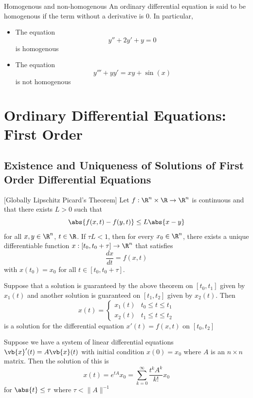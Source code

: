 \documentclass[a4paper]{article}
\begin{document}
\begin{defn}{Homogenous and non-homogenous}{} An ordinary differential equation is said to be homogenous if the term without a derivative is $0$. In particular,
\begin{itemize}
\item The equation $$y''+2y'+y=0$$ is homogenous
\item The equation $$y'''+yy'=xy+\sin(x)$$ is not homogenous
\end{itemize}
\end{defn}

\pagebreak
\section{Ordinary Differential Equations: First Order}
\subsection{Existence and Uniqueness of Solutions of First Order Differential Equations}
\begin{thm}{}{}[Globally Lipschitz Picard's Theorem] Let $f:\R^n\times\R\to\R^n$ is continuous and that there exists $L>0$ such that $$\abs{f(x,t)-f(y,t)}\leq L\abs{x-y}$$ for all $x,y\in\R^n$, $t\in\R$.  If $\tau L<1$, then for every $x_0\in\R^n$, there exists a unique differentiable function $x:[t_0,t_0+\tau]\to\R^n$ that satisfies $$\frac{dx}{dt}=f(x,t)$$ with $x(t_0)=x_0$ for all $t\in[t_0,t_0+\tau]$. 
\end{thm}

\begin{prp}{}{} Suppose that a solution is guaranteed by the above theorem on $[t_0,t_1]$ given by $x_1(t)$ and another solution is guaranteed on $[t_1,t_2]$ given by $x_2(t)$. Then $$x(t)=\begin{cases}
x_1(t) & t_0\leq t\leq t_1\\
x_2(t) & t_1\leq t\leq t_2
\end{cases}$$ is a solution for the differential equation $x'(t)=f(x,t)$ on $[t_0,t_2]$
\end{prp}

\begin{thm}{}{} Suppose we have a system of linear differential equations $\vb{x}'(t)=A\vb{x}(t)$ with initial condition $x(0)=x_0$ where $A$ is an $n\times n$ matrix. Then the solution of this is $$x(t)=e^{tA}x_0=\sum_{k=0}^\infty\frac{t^kA^k}{k!}x_0$$ for $\abs{t}\leq\tau$ where $\tau<\|A\|^{-1}$
\end{thm}
\end{document}
